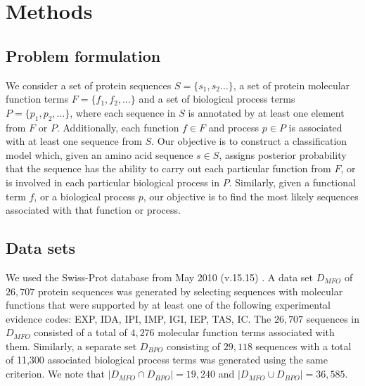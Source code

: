 \section{Methods}

\subsection{Problem formulation}

We consider a set of protein sequences $S = \{s_{1}, s_{2}\dots \}$, a set of protein molecular function terms $F = \{f_{1}, f_{2},\dots \}$ and a set of biological process terms $P = \{p_{1}, p_{2}, \dots \}$, where each sequence in $S$ is annotated by at least one element from $F$ or $P$. Additionally, each function $f\in F$ and process $p\in P$ is associated with at least one sequence from $S$. Our objective is to construct a classification model which, given an amino acid sequence $s\in S$, assigns posterior probability that the sequence has the ability to carry out each particular function from $F$, or is involved in each particular biological process in $P$. Similarly, given a functional term $f$, or a biological process $p$, our objective is to find the most likely sequences associated with that function or process.

\subsection{Data sets}
\label{sec:fanngodata}

We used the Swiss-Prot database from May 2010 (v.15.15) \citep{bairoch2005universal}. A data set $D_{MFO}$ of $26,707$ protein sequences was generated by selecting sequences with molecular functions that were supported by at least one of the following experimental evidence codes: EXP, IDA, IPI, IMP, IGI, IEP, TAS, IC. The $26,707$ sequences in $D_{MFO}$ consisted of a total of $4,276$ molecular function terms associated with them. Similarly, a separate set $D_{BPO}$ consisting of $29,118$ sequences with a total of 11,300 associated biological process terms was generated using the same criterion. We note that $\left| D_{MFO}\cap D_{BPO} \right| = 19,240$ and $\left| D_{MFO} \cup D_{BPO} \right| = 36,585$.

